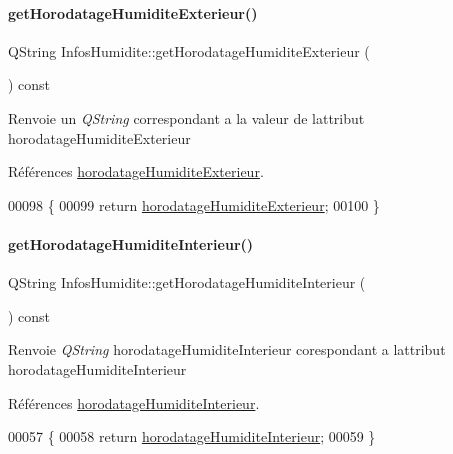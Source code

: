 \paragraph{\texorpdfstring{get\+Horodatage\+Humidite\+Exterieur()}{getHorodatageHumiditeExterieur()}}
{\footnotesize\ttfamily Q\+String Infos\+Humidite\+::get\+Horodatage\+Humidite\+Exterieur (\begin{DoxyParamCaption}{ }\end{DoxyParamCaption}) const}

\begin{DoxyReturn}{Renvoie}
un {\itshape Q\+String} correspondant a la valeur de l\textquotesingle{}attribut horodatage\+Humidite\+Exterieur 
\end{DoxyReturn}


Références \hyperlink{class_infos_humidite_aa08b4f342e83f8ad437a8272698bb512}{horodatage\+Humidite\+Exterieur}.


\begin{DoxyCode}
00098 \{
00099     \textcolor{keywordflow}{return} \hyperlink{class_infos_humidite_aa08b4f342e83f8ad437a8272698bb512}{horodatageHumiditeExterieur};
00100 \}
\end{DoxyCode}
\mbox{\label{class_infos_humidite_a841d2583f206a9097fa3871adc8be568}} 
\paragraph{\texorpdfstring{get\+Horodatage\+Humidite\+Interieur()}{getHorodatageHumiditeInterieur()}}
{\footnotesize\ttfamily Q\+String Infos\+Humidite\+::get\+Horodatage\+Humidite\+Interieur (\begin{DoxyParamCaption}{ }\end{DoxyParamCaption}) const}

\begin{DoxyReturn}{Renvoie}
{\itshape Q\+String} horodatage\+Humidite\+Interieur corespondant a l\textquotesingle{}attribut horodatage\+Humidite\+Interieur 
\end{DoxyReturn}


Références \hyperlink{class_infos_humidite_a38712bac5a2d4d106a016647ad39fedf}{horodatage\+Humidite\+Interieur}.


\begin{DoxyCode}
00057 \{
00058     \textcolor{keywordflow}{return} \hyperlink{class_infos_humidite_a38712bac5a2d4d106a016647ad39fedf}{horodatageHumiditeInterieur};
00059 \}
\end{DoxyCode}
\mbox{\label{class_infos_humidite_a23e537fdfa33336a3970838f445387ce}} 
